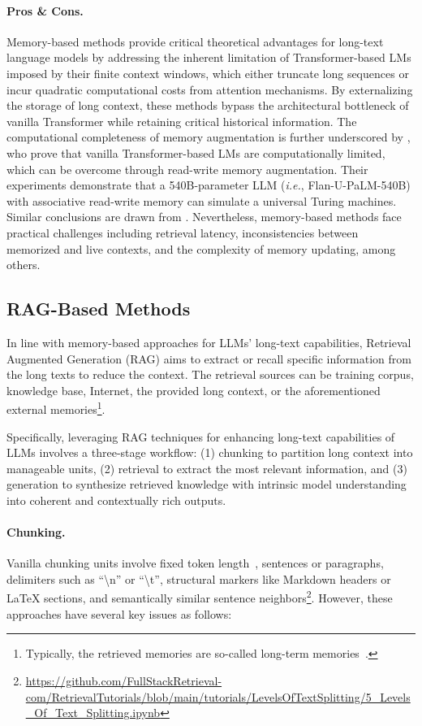 \documentclass[11pt, a4paper, logo, copyright, nonumbering]{map}
\begin{document}
\paragraph{Pros \& Cons.} 
Memory-based methods provide critical theoretical advantages for long-text language models by addressing the inherent limitation of Transformer-based LMs imposed by their finite context windows, which either truncate long sequences or incur quadratic computational costs from attention mechanisms. 
By externalizing the storage of long context, these methods bypass the architectural bottleneck of vanilla Transformer while retaining critical historical information. 
The computational completeness of memory augmentation is further underscored by \citet{schuurmans2023memory}, who prove that vanilla Transformer-based LMs are computationally limited, which can be overcome through read-write memory augmentation. Their experiments demonstrate that a 540B-parameter LLM (\textit{i.e.}, Flan-U-PaLM-540B) with associative read-write memory can simulate a universal Turing machines. 
Similar conclusions are drawn from \cite{dehghani2018universal}. 
Nevertheless, memory-based methods face practical challenges including retrieval latency, inconsistencies between memorized and live contexts, and the complexity of memory updating, among others.


\subsection{RAG-Based Methods}
\label{sec:rag_based_methods}
In line with memory-based approaches for LLMs’ long-text capabilities, Retrieval Augmented Generation (RAG) aims to extract or recall specific information from the long texts to reduce the context. The retrieval sources can be training corpus, knowledge base, Internet, the provided long context, or the aforementioned external memories\footnote{Typically, the retrieved memories are so-called long-term memories~\citep{recurrentgpt}.}.

Specifically, leveraging RAG techniques for enhancing long-text capabilities of LLMs involves a three-stage workflow: 
(1) chunking to partition long context into manageable units, 
(2) retrieval to extract the most relevant information, 
and (3) generation to synthesize retrieved knowledge with intrinsic model understanding into coherent and contextually rich outputs.

\paragraph{Chunking.} 
Vanilla chunking units involve fixed token length~\citep{lewis2020retrievalaugmented}, sentences or paragraphs, delimiters such as ``\textbackslash n'' or ``\textbackslash t'', structural markers like Markdown headers or LaTeX sections, and semantically similar sentence neighbors\footnote{\url{https://github.com/FullStackRetrieval-com/RetrievalTutorials/blob/main/tutorials/LevelsOfTextSplitting/5_Levels_Of_Text_Splitting.ipynb}}. 
However, these approaches have several key issues as follows: 
\end{document}
